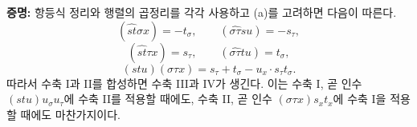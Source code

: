 
\textbf{증명:} 항등식 정리와 행렬의 곱정리를 각각 사용하고 (a)를 고려하면 다음이 따른다.
\[
(\widehat{st}\sigma x)=-t_\sigma,\qquad
(\widehat{\sigma\tau}su)=-s_\tau,
\]
\[
(\widehat{st}\tau x)=s_\tau,\qquad
(\widehat{\sigma\tau}tu)=t_\sigma,
\]
\[
(stu)(\sigma\tau x)=s_\tau+t_\sigma-u_x\cdot s_\tau t_\sigma .
\]
따라서 수축 I과 II를 합성하면 수축 III과 IV가 생긴다. 이는 수축 I, 곧 인수 $(stu)u_\sigma u_\tau$에 수축 II를 적용할 때에도, 수축 II, 곧 인수 $(\sigma\tau x)s_xt_x$에 수축 I을 적용할 때에도 마찬가지이다.

